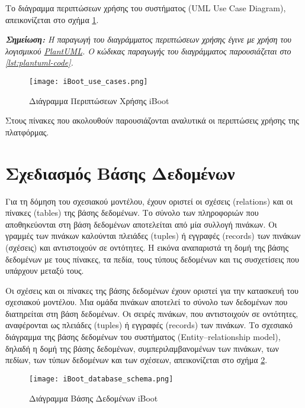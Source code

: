Το διάγραμμα περιπτώσεων χρήσης του συστήματος (UML Use Case Diagram), απεικονίζεται στο σχήμα \ref{fig:iboot-use-cases}.

\textit{\textbf{Σημείωση:} Η παραγωγή του διαγράμματος περιπτώσεων χρήσης έγινε με χρήση του λογισμικού \href{http://www.plantuml.com/plantuml/uml}{PlantUML}. Ο κώδικας παραγωγής του διαγράμματος παρουσιάζεται στο \ref{lst:plantuml-code}.}

\begin{figure}[ht]
	\centering
	\texttt{[image: iBoot\_use\_cases.png]}
	\caption{Διάγραμμα Περιπτώσεων Χρήσης iBoot}
	\label{fig:iboot-use-cases}
\end{figure}

\FloatBarrier

Στους πίνακες που ακολουθούν παρουσιάζονται αναλυτικά οι περιπτώσεις χρήσης της πλατφόρμας.

\FloatBarrier

\FloatBarrier

\section{Σχεδιασμός Βάσης Δεδομένων}
Για τη δόμηση του σχεσιακού μοντέλου, έχουν οριστεί οι σχέσεις (relations) και οι πίνακες (tables) της βάσης δεδομένων. Το σύνολο των πληροφοριών που αποθηκεύονται στη βάση δεδομένων αποτελείται από μία συλλογή πινάκων. Οι γραμμές των πινάκων καλούνται πλειάδες (tuples) ή εγγραφές (records) των πινάκων (σχέσεις) και αντιστοιχούν σε οντότητες. Η εικόνα αναπαριστά τη δομή της βάσης δεδομένων με τους πίνακες, τα πεδία, τους τύπους δεδομένων και τις συσχετίσεις που υπάρχουν μεταξύ τους.

Οι σχέσεις και οι πίνακες της βάσης δεδομένων έχουν οριστεί για την κατασκευή του σχεσιακού μοντέλου. Μια ομάδα πινάκων αποτελεί το σύνολο των δεδομένων που διατηρείται στη βάση δεδομένων. Οι σειρές πινάκων, που αντιστοιχούν σε οντότητες, αναφέρονται ως πλειάδες (tuples) ή εγγραφές (records) των πινάκων. Το σχεσιακό διάγραμμα της βάσης δεδομένων του συστήματος (Entity–relationship model), δηλαδή η δομή της βάσης δεδομένων, συμπεριλαμβανομένων των πινάκων, των πεδίων, των τύπων δεδομένων και των σχέσεων, απεικονίζεται στο σχήμα \ref{fig:iboot-db}.

\begin{figure}[h]
	\centering
	\texttt{[image: iBoot\_database\_schema.png]}
	\caption{Διάγραμμα Βάσης Δεδομένων iBoot}
	\label{fig:iboot-db}
\end{figure}

